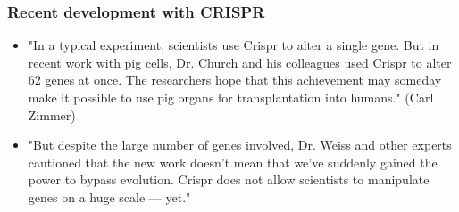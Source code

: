 \documentclass{beamer}
\begin{document}
\begin{frame}
\frametitle{Recent development with CRISPR}
\begin{itemize}
\item "In a typical experiment, scientists use Crispr to alter a single gene.
 But in recent work with pig cells, Dr. Church and his colleagues used Crispr
 to alter 62 genes at once. The researchers hope that this achievement may
 someday make it possible to use pig organs for transplantation into humans." 
(Carl Zimmer) 
\item "But despite the large number of genes involved, 
Dr. Weiss and other experts cautioned that the 
new work doesn’t mean that we’ve suddenly gained the power to 
bypass evolution. Crispr does not allow scientists to manipulate 
genes on a huge scale — yet."

\end{itemize}
\end{frame}
\end{document}
